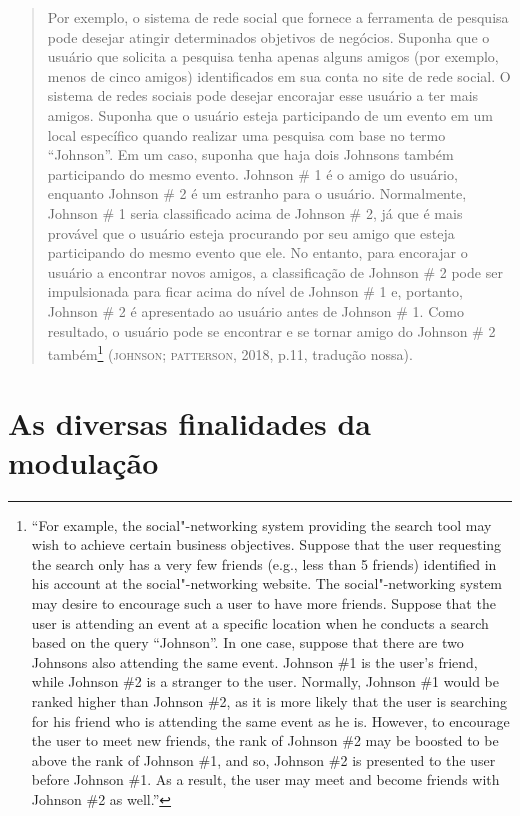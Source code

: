 \begin{quote}
Por exemplo, o sistema de rede social que fornece a ferramenta de
pesquisa pode desejar atingir determinados objetivos de negócios.
Suponha que o usuário que solicita a pesquisa tenha apenas alguns amigos
(por exemplo, menos de cinco amigos) identificados em sua conta no site
de rede social. O sistema de redes sociais pode desejar encorajar esse
usuário a ter mais amigos. Suponha que o usuário esteja participando de
um evento em um local específico quando realizar uma pesquisa com base
no termo ``Johnson''. Em um caso, suponha que haja dois Johnsons também
participando do mesmo evento. Johnson \# 1 é o amigo do usuário,
enquanto Johnson \# 2 é um estranho para o usuário. Normalmente, Johnson
\# 1 seria classificado acima de Johnson \# 2, já que é mais provável
que o usuário esteja procurando por seu amigo que esteja participando do
mesmo evento que ele. No entanto, para encorajar o usuário a encontrar
novos amigos, a classificação de Johnson \# 2 pode ser impulsionada para
ficar acima do nível de Johnson \# 1 e, portanto, Johnson \# 2 é
apresentado ao usuário antes de Johnson \# 1. Como resultado, o usuário
pode se encontrar e se tornar amigo do Johnson \# 2 também\footnote{``For
  example, the social"-networking system providing the search tool may
  wish to achieve certain business objectives. Suppose that the user
  requesting the search only has a very few friends (e.g., less than 5
  friends) identified in his account at the social"-networking website.
  The social"-networking system may desire to encourage such a user to
  have more friends. Suppose that the user is attending an event at a
  specific location when he conducts a search based on the query
  ``Johnson''. In one case, suppose that there are two Johnsons also
  attending the same event. Johnson \#1 is the user's friend, while
  Johnson \#2 is a stranger to the user. Normally, Johnson \#1 would be
  ranked higher than Johnson \#2, as it is more likely that the user is
  searching for his friend who is attending the same event as he is.
  However, to encourage the user to meet new friends, the rank of
  Johnson \#2 may be boosted to be above the rank of Johnson \#1, and
  so, Johnson \#2 is presented to the user before Johnson \#1. As a
  result, the user may meet and become friends with Johnson \#2 as
  well.''} (\textsc{johnson}; \textsc{patterson}, 2018, p.11, tradução nossa).
\end{quote}

\section{As diversas finalidades da modulação}

